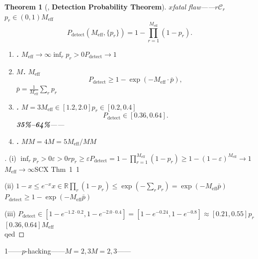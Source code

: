 \documentclass[12pt,a4paper]{article}
\newtheorem{theorem}{Theorem}[section]
\theoremstyle{remark}
\newcommand{\R}{\mathbb{R}}
\newcommand{\coordSys}{\mathcal{C}}
\newcommand{\detectProb}{P_{\text{detect}}}
\begin{document}
\begin{theorem}[, \textbf{Detection Probability Theorem}]
\label{thm:detection}
$x$\textbf{}fatal flaw——$r$$\coordSys_r$$p_r \in (0,1)$$M_{\text{eff}}$\textbf{}
\begin{equation}
    \detectProb(M_{\text{eff}}, \{p_r\}) = 1 - \prod_{r=1}^{M_{\text{eff}}} (1 - p_r).
    \label{eq:detection_prob}
\end{equation}


\begin{enumerate}[label=(\roman*)]
    \item \textbf{.} $M_{\text{eff}} \to \infty$$\inf_r p_r > 0$$\detectProb \to 1$
    
    \item \textbf{$M$.} $M_{\text{eff}}$
    \begin{equation}
        \detectProb \geq 1 - \exp\left(-M_{\text{eff}} \cdot \bar{p}\right),
        \label{eq:detection_lower}
    \end{equation}
    $\bar{p} = \frac{1}{M_{\text{eff}}}\sum_r p_r$
    
    \item \textbf{.} $M=3$$M_{\text{eff}} \in [1.2, 2.0]$$p_r \in [0.2, 0.4]$
    \begin{equation}
        \detectProb \in [0.36, 0.64].
        \label{eq:current_detection}
    \end{equation}
    \textbf{35\%--64\%}——
    
    \item \textbf{.} $M$$M=4$$M=5$$M_{\text{eff}}/M$$M$
\end{enumerate}
\end{theorem}

\begin{proof}[]
(i) $\inf_r p_r > 0$$\varepsilon > 0$$r$$p_r \geq \varepsilon$$\detectProb = 1 - \prod_{r=1}^{M_{\text{eff}}}(1-p_r) \geq 1 - (1-\varepsilon)^{M_{\text{eff}}} \to 1$$M_{\text{eff}} \to \infty$SCX Thm~1~\cite{scx_thm1}1

(ii) $1-x \leq e^{-x}$$x \in \R$$\prod_{r}(1-p_r) \leq \exp(-\sum_r p_r) = \exp(-M_{\text{eff}}\bar{p})$$\detectProb \geq 1 - \exp(-M_{\text{eff}}\bar{p})$

(iii) $\detectProb \in [1-e^{-1.2 \cdot 0.2}, 1-e^{-2.0 \cdot 0.4}] = [1-e^{-0.24}, 1-e^{-0.8}] \approx [0.21, 0.55]$$p_r$$[0.36, 0.64]$$M_{\text{eff}}$\\qed
\end{proof}

\begin{honestcrit}{1\textit{}——$p$-hacking——$M=2,3$\textbf{}$M=2,3$——\textit{}}
\end{honestcrit}
\end{document}
